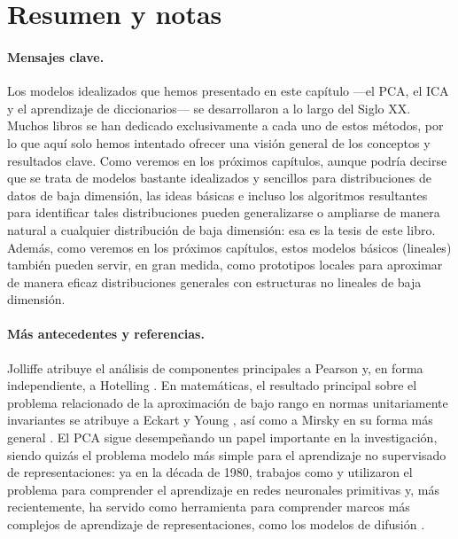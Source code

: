 \documentclass[../../book-main.tex]{subfiles}
\begin{document}
\section{Resumen y notas}

\paragraph{Mensajes clave.} Los modelos idealizados que hemos presentado en
este capítulo ---el PCA, el ICA y el aprendizaje de diccionarios--- se 
desarrollaron a lo largo del Siglo XX.  Muchos libros se han dedicado exclusivamente a cada uno de estos métodos, 
por lo que aquí solo hemos intentado ofrecer una visión general de los conceptos y resultados clave. Como
veremos en los próximos capítulos, aunque podría decirse que se trata de
modelos bastante idealizados y sencillos para distribuciones de datos de baja dimensión, las
ideas básicas e incluso los algoritmos resultantes para identificar tales
distribuciones pueden generalizarse o ampliarse de manera natural a cualquier
distribución de baja dimensión: esa es la tesis de este libro. Además,
como veremos en los próximos capítulos, estos modelos básicos (lineales)
también pueden servir, en gran medida, como prototipos locales para
aproximar de manera eficaz distribuciones generales con estructuras no lineales
de baja dimensión.

\paragraph{Más antecedentes y referencias.}
Jolliffe \cite{Jolliffe1986} atribuye el análisis de componentes principales a Pearson
\cite{Pearson1901} y, en forma independiente, a Hotelling \cite{Hotelling1933}. En
matemáticas, el resultado principal sobre el problema relacionado de la aproximación de bajo rango en
normas unitariamente invariantes se atribuye a Eckart y Young
\cite{Eckart1936-ep}, así como a Mirsky en su forma más general \cite{Mirsky1960-ek}.
El PCA sigue desempeñando un papel importante en la investigación, siendo quizás el problema 
modelo más simple para el aprendizaje no supervisado de representaciones: ya en la década de 1980,
trabajos como \textcite{Oja1982SimplifiedNM} y \textcite{Baldi89} utilizaron el
problema para comprender el aprendizaje en redes neuronales primitivas y, más recientemente,
ha servido como herramienta para comprender marcos más complejos de aprendizaje de representaciones,
como los modelos de difusión \cite{wang2024diffusion}.
\end{document}
